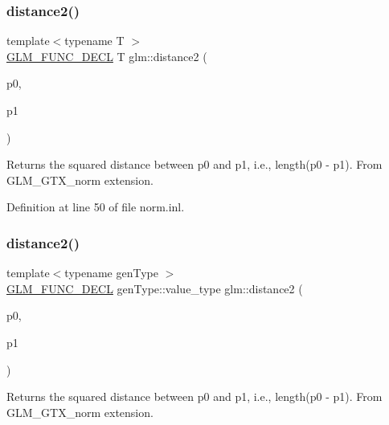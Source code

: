 \subsubsection{\texorpdfstring{distance2()}{distance2()}\hspace{0.1cm}{\footnotesize\ttfamily [1/2]}}
{\footnotesize\ttfamily template$<$typename T $>$ \\
\hyperlink{setup_8hpp_ab2d052de21a70539923e9bcbf6e83a51}{G\+L\+M\+\_\+\+F\+U\+N\+C\+\_\+\+D\+E\+CL} T glm\+::distance2 (\begin{DoxyParamCaption}\item[{T const \&}]{p0,  }\item[{T const \&}]{p1 }\end{DoxyParamCaption})}

Returns the squared distance between p0 and p1, i.\+e., length(p0 -\/ p1). From G\+L\+M\+\_\+\+G\+T\+X\+\_\+norm extension. 

Definition at line 50 of file norm.\+inl.

\mbox{\label{group__gtx__norm_gaec2d9df62436879b48207d39516f3788}} 
\subsubsection{\texorpdfstring{distance2()}{distance2()}\hspace{0.1cm}{\footnotesize\ttfamily [2/2]}}
{\footnotesize\ttfamily template$<$typename gen\+Type $>$ \\
\hyperlink{setup_8hpp_ab2d052de21a70539923e9bcbf6e83a51}{G\+L\+M\+\_\+\+F\+U\+N\+C\+\_\+\+D\+E\+CL} gen\+Type\+::value\+\_\+type glm\+::distance2 (\begin{DoxyParamCaption}\item[{gen\+Type const \&}]{p0,  }\item[{gen\+Type const \&}]{p1 }\end{DoxyParamCaption})}

Returns the squared distance between p0 and p1, i.\+e., length(p0 -\/ p1). From G\+L\+M\+\_\+\+G\+T\+X\+\_\+norm extension. \mbox{\label{group__gtx__norm_gae7c48d18df3e4a9c13bb9c003e434d5f}} 
